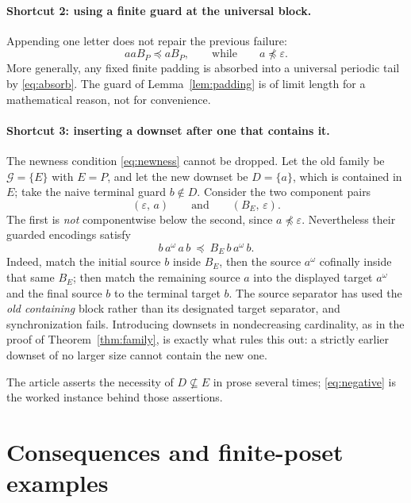 \documentclass[11pt,a4paper]{article}
\numberwithin{equation}{section}
\theoremstyle{definition}
\theoremstyle{remark}
\newcommand{\G}{\mathcal G}
\newcommand{\eps}{\varepsilon}
\newcommand{\emb}{\preccurlyeq}
\begin{document}
\paragraph{Shortcut 2: using a finite guard at the universal block.}
Appending one letter does not repair the previous failure:
\begin{equation}\label{eq:neg2}
 aaB_P\emb aB_P,\qquad\text{while}\qquad a\not\emb\eps .
\end{equation}
More generally, any fixed finite padding is absorbed into a universal
periodic tail by \eqref{eq:absorb}. The guard of Lemma~\ref{lem:padding} is of
limit length for a mathematical reason, not for convenience.

\paragraph{Shortcut 3: inserting a downset after one that contains it.}
The newness condition \eqref{eq:newness} cannot be dropped. Let the old family
be $\G=\{E\}$ with $E=P$, and let the new downset be $D=\{a\}$, which is
contained in $E$; take the naive terminal guard $b\notin D$. Consider the two
component pairs
\[
 (\eps,\,a)\qquad\text{and}\qquad(B_E,\,\eps).
\]
The first is \emph{not} componentwise below the second, since
$a\not\emb\eps$. Nevertheless their guarded encodings satisfy
\begin{equation}\label{eq:negative}
 b\,a^\omega\,a\,b\ \emb\ B_E\,b\,a^\omega\,b .
\end{equation}
Indeed, match the initial source $b$ inside $B_E$, then the source $a^\omega$
cofinally inside that same $B_E$; then match the remaining source $a$ into the
displayed target $a^\omega$ and the final source $b$ to the terminal target
$b$. The source separator has used the \emph{old containing} block rather than
its designated target separator, and synchronization fails. Introducing
downsets in nondecreasing cardinality, as in the proof of
Theorem~\ref{thm:family}, is exactly what rules this out: a strictly earlier
downset of no larger size cannot contain the new one.

The article asserts the necessity of $D\nsubseteq E$ in prose several times;
\eqref{eq:negative} is the worked instance behind those assertions.

\section{Consequences and finite-poset examples}
\label{sec:consequences}
\end{document}
